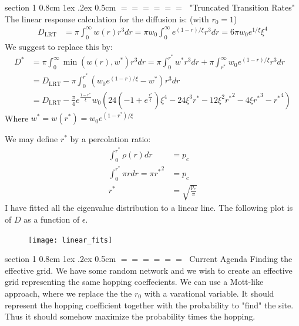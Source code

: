 \documentclass[onecolumn,fleqn,notitlepage,secnumarabic]{revtex4}
\makeatletter
\def\section{%
  \@startsection
    {section}%
    {1}%
    {\z@}%
    {0.8cm \@plus1ex \@minus .2ex}%
    {0.5cm}%
    {\Large\bf $=\!=\!=\!=\!=\!=\;$}%
}%
\makeatother
\begin{document}
\section{"Truncated Transition Rates"}
The linear response calculation for the diffusion is: (with $r_0=1$)
\begin{align}
  D_\textrm{LRT} &=\pi \int_0^\infty w(r) r^3 dr =  \pi w_0\int_0^\infty e^{(1-r)/\xi} r^3 dr = 6\pi w_0 e^{1/\xi} \xi^4
\end{align}
We suggest to replace this by:
\begin{align}
  D^* &= \pi \int_0^\infty \operatorname{min}(w(r), w^*) r^3 dr = \pi \int_0^{r^*}  w^* r^3 dr + \pi\int_{r^*}^\infty w_0 e^{(1-r)/\xi} r^3 dr \\
     &= D_\textrm{LRT} - \pi\int_0^{r^*} (w_0 e^{(1-r)/\xi} - w^*) r^3 dr \\&= D_\textrm{LRT} - \frac{\pi}{4} e^{\frac{1-r^*}{\xi}} w_0 \left(24 \left(-1+e^{\frac{r^*}{\xi}}\right) \xi^4-24 \xi^3 r^*-12 \xi^2 {r^*}^2-4 \xi {r^*}^3-{r^*}^4\right)
\end{align}
Where $w^* = w(r^*) = w_0e^{(1-r^*)/\xi}$

We may define $r^*$ by a percolation ratio:
\begin{align}
  \int_0^{r^*} \rho(r) dr &= p_c\\
  \int_0^{r^*} \pi r dr =\pi {r^*}^2 &= p_c\\
  r^* &= \sqrt{\frac{p_c}{\pi}}
\end{align}
I have fitted all the eigenvalue distribution to a linear line. The following plot is of $D$ as a function of $\epsilon$.
\begin{figure}[H]
\texttt{[image: linear\_fits]}
\end{figure}


%
\section{Current Agenda}
Finding the effective grid. We have some random network and we wish to create an effective grid representing the same hopping coeffecients. We can use a Mott-like approach, where we replace the the $r_0$ with a varational variable. It should represent the hopping coefficient together with the probability to "find" the site. Thus it should somehow maximize the probability times the hopping. 



%

\end{document}
